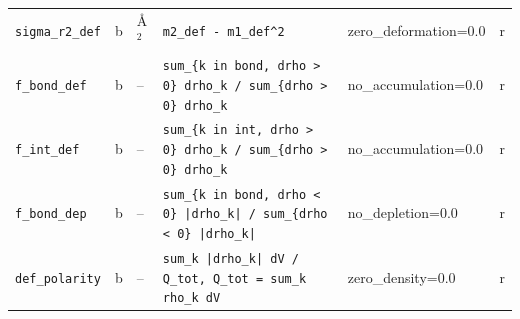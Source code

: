 \begin{table}[p]
\begin{tabular}{p{3.3cm}cp{1.4cm}p{6.6cm}p{2.3cm}c}
\texttt{sigma\_r2\_def} & b & \AA$^2$ & \texttt{m2\_def - m1\_def\^{}2} & zero\_deformation=0.0 & r \\
\texttt{f\_bond\_def} & b & -- & \texttt{sum\_\{k in bond, drho > 0\} drho\_k / sum\_\{drho > 0\} drho\_k} & no\_accumulation=0.0 & r \\
\texttt{f\_int\_def} & b & -- & \texttt{sum\_\{k in int, drho > 0\} drho\_k / sum\_\{drho > 0\} drho\_k} & no\_accumulation=0.0 & r \\
\texttt{f\_bond\_dep} & b & -- & \texttt{sum\_\{k in bond, drho < 0\} |drho\_k| / sum\_\{drho < 0\} |drho\_k|} & no\_depletion=0.0 & r \\
\texttt{def\_polarity} & b & -- & \texttt{sum\_k |drho\_k| dV / Q\_tot,  Q\_tot = sum\_k rho\_k dV} & zero\_density=0.0 & r \\
\bottomrule
\end{tabular}
\end{table}

